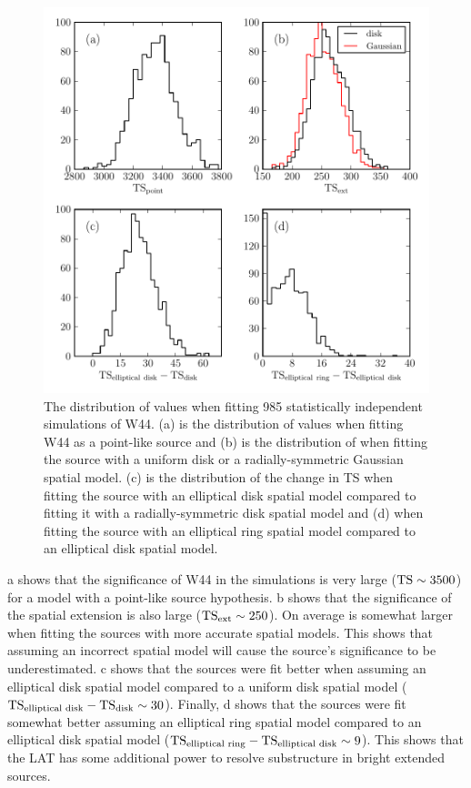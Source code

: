 \begin{figure}[htbp]
  \includegraphics{chapters/extended_analysis/figures/mc_plots/ts_comparison_w44sim_color.pdf}
  \caption{The distribution of \ts values when fitting 985 statistically
  independent simulations of W44. (a) is the distribution of \ts
  values when fitting W44 as a point-like source and (b) is the
  distribution of \tsext when fitting the source with a uniform disk or
  a radially-symmetric Gaussian spatial model. (c) is the distribution
  of the change in TS when fitting the source with an elliptical disk
  spatial model compared to fitting it with a radially-symmetric disk
  spatial model and (d) when fitting the source with an elliptical
  ring spatial model compared to an elliptical disk spatial model.}
\end{figure}

a shows that the significance of W44 in the
simulations is very large ($\mathrm{TS}\sim3500$) for a model with a point-like
source hypothesis.  b shows that the
significance of the spatial extension is also large ($\mathrm{TS}_\mathrm{ext}\sim250$).
On average \tsext is somewhat larger when fitting the sources with
more accurate spatial models.  This shows that assuming an incorrect
spatial model will cause the source's significance to be underestimated.
c shows that the sources were fit better
when assuming an elliptical disk spatial model compared to a uniform disk
spatial model ($\ts_\text{elliptical\ disk}-\ts_\text{disk}\sim30$).
Finally, d shows that the sources
were fit somewhat better assuming an elliptical ring spatial model
compared to an elliptical disk spatial model ($\mathrm{TS}_\text{elliptical\
ring}-\mathrm{TS}_\text{elliptical\ disk}\sim9$). This shows that the LAT has
some additional power to resolve substructure in bright extended sources.

